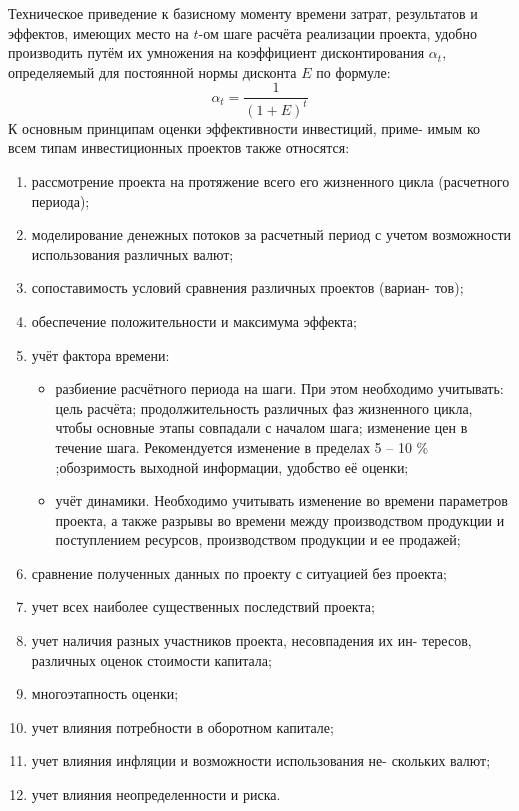 \documentclass[a4paper,12pt]{article}
\begin{document}
Техническое приведение к базисному моменту времени затрат, результатов и эффектов, имеющих место на ${t}$-ом шаге расчёта реализации проекта, удобно производить путём их умножения на коэффициент дисконтирования $\alpha_t$, определяемый для постоянной нормы дисконта ${E}$ по формуле:
\begin{equation}
		\alpha_t = \frac{1}{(1+E)^t}
\end{equation}
К основным принципам оценки эффективности инвестиций, приме-
имым ко всем типам инвестиционных проектов также относятся:
\begin{enumerate}
\item рассмотрение проекта на протяжение всего его жизненного цикла
(расчетного периода);
\item моделирование денежных потоков за расчетный период с учетом
возможности использования различных валют;
\item сопоставимость условий сравнения различных проектов (вариан-
тов);
\item обеспечение положительности и максимума эффекта;
\item учёт фактора времени:
	\begin{itemize}
\item разбиение расчётного периода на шаги. При этом
необходимо учитывать: цель расчёта; продолжительность
различных фаз жизненного цикла, чтобы основные этапы
совпадали с началом шага; изменение цен в течение шага. Рекомендуется изменение в пределах 5 – 10 \% ;обозримость выходной информации, удобство её оценки;\\
\item учёт динамики. Необходимо учитывать изменение
во времени параметров проекта, а также разрывы во времени
между производством продукции и поступлением ресурсов,
производством продукции и ее продажей;
	\end{itemize}
\item
 сравнение полученных данных по проекту с ситуацией без
проекта;
\item
 учет всех наиболее существенных последствий проекта;
\item
 учет наличия разных участников проекта, несовпадения их ин-
тересов, различных оценок стоимости капитала;
\item
 многоэтапность оценки;
\item
 учет влияния потребности в оборотном капитале;
\item
 учет влияния инфляции и возможности использования не-
скольких валют;
\item
 учет влияния неопределенности и риска.
\end{enumerate}
\end{document}
